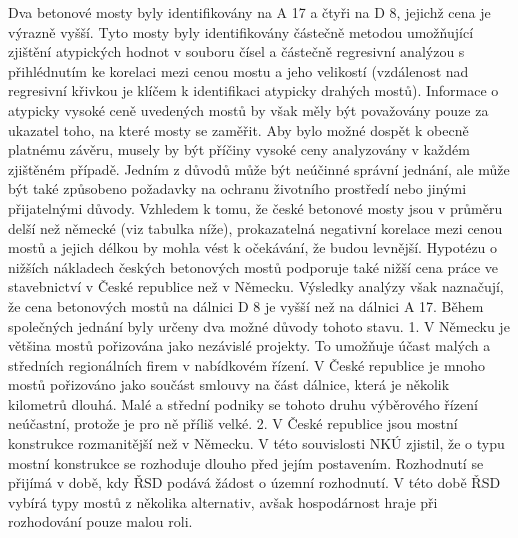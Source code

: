 \documentclass[10pt]{article}
\begin{document}
Dva betonové mosty byly identifikovány na A 17 a čtyři na D 8, jejichž cena je výrazně vyšší.
Tyto mosty byly identifikovány částečně metodou umožňující zjištění atypických hodnot v souboru čísel a částečně regresivní analýzou s přihlédnutím ke korelaci mezi cenou mostu a jeho velikostí (vzdálenost nad regresivní křivkou je klíčem k identifikaci atypicky drahých mostů).
Informace o atypicky vysoké ceně uvedených mostů by však měly být považovány pouze za ukazatel toho, na které mosty se zaměřit.
Aby bylo možné dospět k obecně platnému závěru, musely by být příčiny vysoké ceny analyzovány v každém zjištěném případě.
Jedním z důvodů může být neúčinné správní jednání, ale může být také způsobeno požadavky na ochranu životního prostředí nebo jinými přijatelnými důvody.
Vzhledem k tomu, že české betonové mosty jsou v průměru delší než německé (viz tabulka níže), prokazatelná negativní korelace mezi cenou mostů a jejich délkou by mohla vést k očekávání, že budou levnější.
Hypotézu o nižších nákladech českých betonových mostů podporuje také nižší cena práce ve stavebnictví v České republice než v Německu.
Výsledky analýzy však naznačují, že cena betonových mostů na dálnici D 8 je vyšší než na dálnici A 17.
Během společných jednání byly určeny dva možné důvody tohoto stavu.
1.
V Německu je většina mostů pořizována jako nezávislé projekty.
To umožňuje účast malých a středních regionálních firem v nabídkovém řízení.
V České republice je mnoho mostů pořizováno jako součást smlouvy na část dálnice, která je několik kilometrů dlouhá.
Malé a střední podniky se tohoto druhu výběrového řízení neúčastní, protože je pro ně příliš velké.
2.
V České republice jsou mostní konstrukce rozmanitější než v Německu.
V této souvislosti NKÚ zjistil, že o typu mostní konstrukce se rozhoduje dlouho před jejím postavením.
Rozhodnutí se přijímá v době, kdy ŘSD podává žádost o územní rozhodnutí.
V této době ŘSD vybírá typy mostů z několika alternativ, avšak hospodárnost hraje při rozhodování pouze malou roli.
\end{document}
